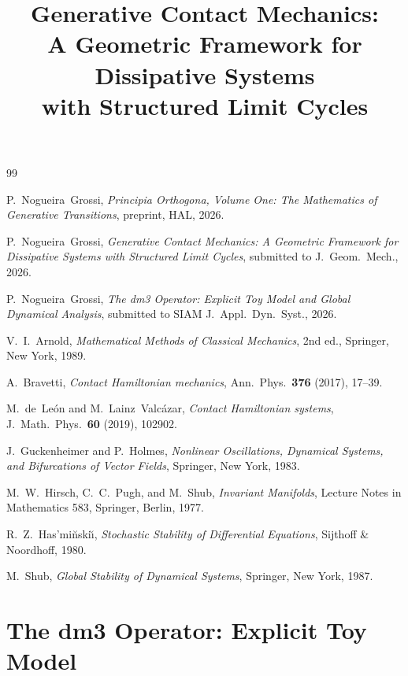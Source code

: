 \documentclass[12pt, oneside]{book}
\theoremstyle{plain}
\theoremstyle{definition}
\theoremstyle{remark}
\begin{document}
\begin{thebibliography}{99}

P.~Nogueira~Grossi,
\emph{Principia Orthogona, Volume One: The Mathematics of
  Generative Transitions},
preprint, HAL, 2026.

P.~Nogueira~Grossi,
\emph{Generative Contact Mechanics: A Geometric Framework for
  Dissipative Systems with Structured Limit Cycles},
submitted to J.\ Geom.\ Mech., 2026.

P.~Nogueira~Grossi,
\emph{The dm3 Operator: Explicit Toy Model and Global Dynamical
  Analysis},
submitted to SIAM J.\ Appl.\ Dyn.\ Syst., 2026.

V.~I.~Arnold,
\emph{Mathematical Methods of Classical Mechanics},
2nd ed., Springer, New York, 1989.

A.~Bravetti,
\emph{Contact Hamiltonian mechanics},
Ann.\ Phys.\ \textbf{376} (2017), 17--39.

M.~de~Le{\'o}n and M.~Lainz~Valc{\'a}zar,
\emph{Contact Hamiltonian systems},
J.\ Math.\ Phys.\ \textbf{60} (2019), 102902.

J.~Guckenheimer and P.~Holmes,
\emph{Nonlinear Oscillations, Dynamical Systems, and Bifurcations
  of Vector Fields},
Springer, New York, 1983.

M.~W.~Hirsch, C.~C.~Pugh, and M.~Shub,
\emph{Invariant Manifolds},
Lecture Notes in Mathematics 583, Springer, Berlin, 1977.

R.~Z.~Has{'}mi{\u{n}}ski{\u{\i}},
\emph{Stochastic Stability of Differential Equations},
Sijthoff \& Noordhoff, 1980.

M.~Shub,
\emph{Global Stability of Dynamical Systems},
Springer, New York, 1987.

\end{thebibliography}
\cleardoublepage


\part{The dm3 Operator: Explicit Toy Model}

\title[Generative Contact Mechanics]{%
  Generative Contact Mechanics:\\
  A Geometric Framework for Dissipative Systems\\
  with Structured Limit Cycles}
\end{document}
